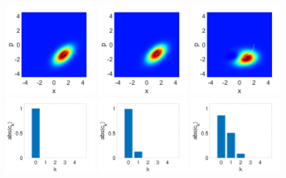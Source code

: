 \documentclass[12pt]{iopart} %
\begin{document}
\begin{figure}
\begin{centering}
	  \includegraphics[width=0.3\textwidth]{WigJump1Anh.pdf}
	  \includegraphics[width=0.3\textwidth]{WigJump2Anh.pdf}
	  \includegraphics[width=0.3\textwidth]{WigJump3Anh.pdf} \\
	  \includegraphics[width=0.3\textwidth]{HistogramAnh1.pdf}
	  \includegraphics[width=0.3\textwidth]{HistogramAnh2.pdf}
	  \includegraphics[width=0.3\textwidth]{HistogramAnh3.pdf}

\end{centering}
\end{figure}
\end{document}
